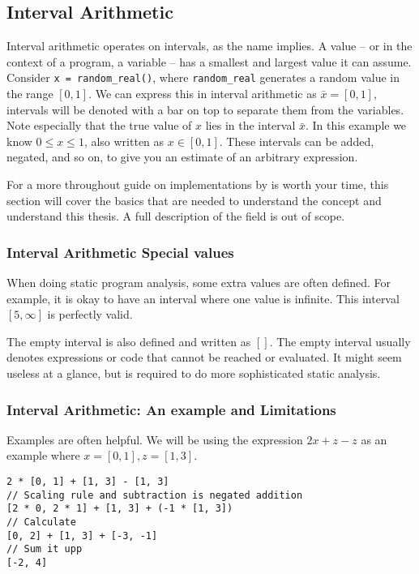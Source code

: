 \subsection{Interval Arithmetic}
Interval arithmetic operates on intervals, as the name implies. A value -- or in the context of a program, a variable -- has a smallest and largest value it can assume. Consider \verb`x = random_real()`, where \verb`random_real` generates a random value in the range $[0, 1]$. We can express this in interval arithmetic as $\bar{x} = [0, 1]$, intervals will be denoted with a bar on top to separate them from the variables. Note especially that the true value of $x$ lies in the interval $\bar{x}$. In this example we know $0 \leq x \leq 1$, also written as $x \in [0, 1]$. These intervals can be added, negated, and so on, to give you an estimate of an arbitrary expression.

For a more throughout guide on implementations  by \citeauthor{src:affAri} is worth your time, this section will cover the basics that are needed to understand the concept and understand this thesis. A full description of the field is out of scope.

\subsubsection{Interval Arithmetic Special values}
When doing static program analysis, some extra values are often defined. For example, it is okay to have an interval where one value is infinite. This interval $[5, \infty]$ is perfectly valid.

The empty interval is also defined and written as $[]$. The empty interval usually denotes expressions or code that cannot be reached or evaluated. It might seem useless at a glance, but is required to do more sophisticated static analysis.

\subsubsection{Interval Arithmetic: An example and Limitations}
Examples are often helpful.
We will be using the expression $2x + z - z$ as an example where $x = [0, 1], z = [1, 3]$.

\begin{verbatim}
2 * [0, 1] + [1, 3] - [1, 3]
// Scaling rule and subtraction is negated addition 
[2 * 0, 2 * 1] + [1, 3] + (-1 * [1, 3])
// Calculate
[0, 2] + [1, 3] + [-3, -1]
// Sum it upp
[-2, 4]
\end{verbatim}

